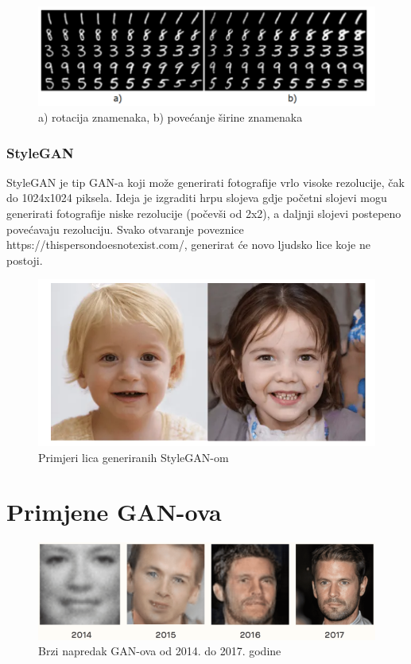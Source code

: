 \documentclass[times, utf8, diplomski]{fer}
\begin{document}
\begin{figure}[h]
\centering
\includegraphics[scale=0.7]{InfoGAN.png}
\caption{a) rotacija znamenaka, b) povećanje širine znamenaka \cite{Tipovi}}
\end{figure}

\subsubsection{StyleGAN}
StyleGAN je tip GAN-a koji može generirati fotografije vrlo visoke rezolucije, čak do 1024x1024 piksela. Ideja je izgraditi hrpu slojeva gdje početni slojevi mogu generirati fotografije niske rezolucije (počevši od 2x2), a daljnji slojevi postepeno povećavaju rezoluciju. Svako otvaranje poveznice https://thispersondoesnotexist.com/, generirat će novo ljudsko lice koje ne postoji. \cite{Style}

\begin{figure}[h]
\centering
\includegraphics[scale=0.7]{StyleGAN.png}
\caption{Primjeri lica generiranih StyleGAN-om \cite{Style}} 
\end{figure}

\newpage
\section{Primjene GAN-ova}

\begin{figure}[h]
\centering
\includegraphics[scale=0.8]{Primjena.png}
\caption{Brzi napredak GAN-ova od 2014. do 2017. godine \cite{slika2}}
\end{figure}
\end{document}
